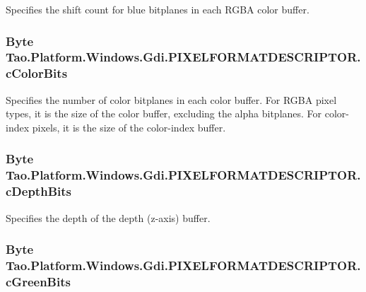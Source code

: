 Specifies the shift count for blue bitplanes in each RGBA color buffer. 

\hypertarget{struct_tao_1_1_platform_1_1_windows_1_1_gdi_1_1_p_i_x_e_l_f_o_r_m_a_t_d_e_s_c_r_i_p_t_o_r_a5c0e0428c67157754e663f38482228ab}{
\subsubsection[{cColorBits}]{\setlength{\rightskip}{0pt plus 5cm}Byte {\bf Tao.Platform.Windows.Gdi.PIXELFORMATDESCRIPTOR.cColorBits}}}
\label{struct_tao_1_1_platform_1_1_windows_1_1_gdi_1_1_p_i_x_e_l_f_o_r_m_a_t_d_e_s_c_r_i_p_t_o_r_a5c0e0428c67157754e663f38482228ab}


Specifies the number of color bitplanes in each color buffer. For RGBA pixel types, it is the size of the color buffer, excluding the alpha bitplanes. For color-\/index pixels, it is the size of the color-\/index buffer. 

\hypertarget{struct_tao_1_1_platform_1_1_windows_1_1_gdi_1_1_p_i_x_e_l_f_o_r_m_a_t_d_e_s_c_r_i_p_t_o_r_ac7f87af2fe3f317ba331c9e6da484867}{
\subsubsection[{cDepthBits}]{\setlength{\rightskip}{0pt plus 5cm}Byte {\bf Tao.Platform.Windows.Gdi.PIXELFORMATDESCRIPTOR.cDepthBits}}}
\label{struct_tao_1_1_platform_1_1_windows_1_1_gdi_1_1_p_i_x_e_l_f_o_r_m_a_t_d_e_s_c_r_i_p_t_o_r_ac7f87af2fe3f317ba331c9e6da484867}


Specifies the depth of the depth (z-\/axis) buffer. 

\hypertarget{struct_tao_1_1_platform_1_1_windows_1_1_gdi_1_1_p_i_x_e_l_f_o_r_m_a_t_d_e_s_c_r_i_p_t_o_r_a7f673a48f7d6724469890c48741ba512}{
\subsubsection[{cGreenBits}]{\setlength{\rightskip}{0pt plus 5cm}Byte {\bf Tao.Platform.Windows.Gdi.PIXELFORMATDESCRIPTOR.cGreenBits}}}
\label{struct_tao_1_1_platform_1_1_windows_1_1_gdi_1_1_p_i_x_e_l_f_o_r_m_a_t_d_e_s_c_r_i_p_t_o_r_a7f673a48f7d6724469890c48741ba512}


